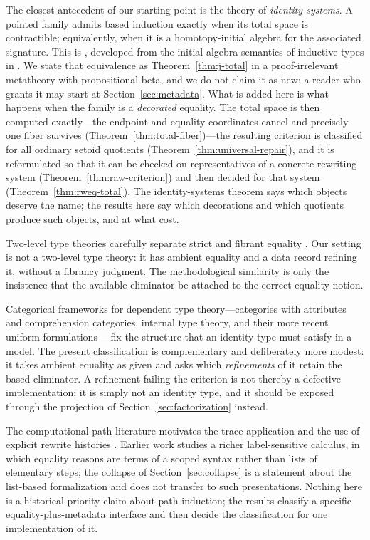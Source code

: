 \documentclass[10pt,reqno]{amsart}
\begin{document}
The closest antecedent of our starting point is the theory of \emph{identity
systems}.  A pointed family admits based induction exactly when its total space
is contractible; equivalently, when it is a homotopy-initial algebra for the
associated signature.  This is \cite[Thm.~5.8.2]{HoTTBook2013}, developed from
the initial-algebra semantics of inductive types in
\cite{AwodeyGambinoSojakova2012,AwodeyGambinoSojakova2017}.  We state that
equivalence as Theorem~\ref{thm:j-total} in a proof-irrelevant metatheory with
propositional beta, and we do not claim it as new; a reader who grants it may
start at Section~\ref{sec:metadata}.  What is added here is what happens when the
family is a \emph{decorated} equality.  The total space is then computed
exactly---the endpoint and equality coordinates cancel and precisely one fiber
survives (Theorem~\ref{thm:total-fiber})---the resulting criterion is classified
for all ordinary setoid quotients (Theorem~\ref{thm:universal-repair}), and it is
reformulated so that it can be checked on representatives of a concrete rewriting
system (Theorem~\ref{thm:raw-criterion}) and then decided for that system
(Theorem~\ref{thm:rweq-total}).  The identity-systems theorem says which objects
deserve the name; the results here say which decorations and which quotients
produce such objects, and at what cost.

Two-level type theories carefully separate strict and fibrant equality
\cite{Capriotti2016,AltenkirchCapriottiKraus2016,AnnenkovEtAl2023}.
Our setting is not a two-level type theory: it has ambient equality and a data
record refining it, without a fibrancy judgment.  The methodological
similarity is only the insistence that the available eliminator be attached to
the correct equality notion.

Categorical frameworks for dependent type theory---categories with attributes
and comprehension categories, internal type theory, and their more recent
uniform formulations \cite{Cartmell1986,Dybjer1996,Hofmann1997,Uemura2023}---fix
the structure that an identity type must satisfy in a model.  The present
classification is complementary and deliberately more modest: it takes ambient
equality as given and asks which \emph{refinements} of it retain the based
eliminator.  A refinement failing the criterion is not thereby a defective
implementation; it is simply not an identity type, and it should be exposed
through the projection of Section~\ref{sec:factorization} instead.

The computational-path literature motivates the trace application and the
use of explicit rewrite histories
\cite{deQueirozEtAl2016,RamosEtAl2017,RamosEtAl2018,RamosEtAl2026}.
Earlier work studies a richer label-sensitive calculus, in which equality
reasons are terms of a scoped syntax rather than lists of elementary steps; the
collapse of Section~\ref{sec:collapse} is a statement about the list-based
formalization and does not transfer to such presentations.  Nothing here is a
historical-priority claim about path induction; the results classify a specific
equality-plus-metadata interface and then decide the classification for one
implementation of it.
\end{document}
